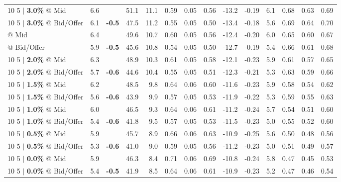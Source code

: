 \documentclass{beamer}
\begin{document}
\begin{frame}
\begin{table}
{\begin{tabular}{lrcrrrrrrrrrrr}
\addlinespace
{10 5 $|$ \bf 3.0\%} @ Mid & 6.6 & & 51.1 & 11.1 & 0.59 & 0.05 & 0.56 & -13.2 & -0.19 & 6.1 & 0.68 & 0.63 & 0.69\\
{10 5 $|$ \bf 3.0\%} @ Bid/Offer & 6.1 & {\bf \color{red}-0.5} & 47.5 & 11.2 & 0.55 & 0.05 & 0.50 & -13.4 & -0.18 & 5.6 & 0.69 & 0.64 & 0.70\\
\addlinespace
\color{blue}{10 5 $|$ \bf 2.5\%} @ Mid & 6.4 & & 49.6 & 10.7 & 0.60 & 0.05 & 0.56 & -12.4 & -0.20 & 6.0 & 0.65 & 0.60 & 0.67\\
\color{blue}{10 5 $|$ \bf 2.5\%} @ Bid/Offer & 5.9 & {\bf \color{red}-0.5} & 45.6 & 10.8 & 0.54 & 0.05 & 0.50 & -12.7 & -0.19 & 5.4 & 0.66 & 0.61 & 0.68\\
\addlinespace
{10 5 $|$ \bf 2.0\%} @ Mid & 6.3 & & 48.9 & 10.3 & 0.61 & 0.05 & 0.58 & -12.1 & -0.23 & 5.9 & 0.61 & 0.57 & 0.65\\
{10 5 $|$ \bf 2.0\%} @ Bid/Offer & 5.7 & {\bf \color{red}-0.6} & 44.6 & 10.4 & 0.55 & 0.05 & 0.51 & -12.3 & -0.21 & 5.3 & 0.63 & 0.59 & 0.66\\
\addlinespace
{10 5 $|$ \bf 1.5\%} @ Mid & 6.2 & & 48.5 & 9.8 & 0.64 & 0.06 & 0.60 & -11.6 & -0.23 & 5.9 & 0.58 & 0.54 & 0.62\\
{10 5 $|$ \bf 1.5\%} @ Bid/Offer & 5.6 & {\bf \color{red}-0.6} & 43.9 & 9.9 & 0.57 & 0.05 & 0.53 & -11.9 & -0.22 & 5.3 & 0.59 & 0.55 & 0.63\\
\addlinespace
{10 5 $|$ \bf 1.0\%} @ Mid & 6.0 & & 46.5 & 9.3 & 0.64 & 0.06 & 0.61 & -11.2 & -0.24 & 5.7 & 0.54 & 0.51 & 0.60\\
{10 5 $|$ \bf 1.0\%} @ Bid/Offer & 5.4 & {\bf \color{red}-0.6} & 41.8 & 9.5 & 0.57 & 0.05 & 0.53 & -11.5 & -0.23 & 5.0 & 0.55 & 0.52 & 0.60\\
\addlinespace
{10 5 $|$ \bf 0.5\%} @ Mid & 5.9 & & 45.7 & 8.9 & 0.66 & 0.06 & 0.63 & -10.9 & -0.25 & 5.6 & 0.50 & 0.48 & 0.56\\
{10 5 $|$ \bf 0.5\%} @ Bid/Offer & 5.3 & {\bf \color{red}-0.6} & 41.0 & 9.0 & 0.59 & 0.05 & 0.56 & -11.2 & -0.23 & 5.0 & 0.51 & 0.49 & 0.57\\
\addlinespace
{10 5 $|$ \bf 0.0\%} @ Mid & 5.9 & & 46.3 & 8.4 & 0.71 & 0.06 & 0.69 & -10.8 & -0.24 & 5.8 & 0.47 & 0.45 & 0.53\\
{10 5 $|$ \bf 0.0\%} @ Bid/Offer & 5.4 & {\bf \color{red}-0.5} & 41.9 & 8.5 & 0.64 & 0.06 & 0.61 & -10.9 & -0.23 & 5.2 & 0.47 & 0.46 & 0.54\\
\bottomrule
\end{tabular}
}
\end{table}
\end{frame}
\end{document}
